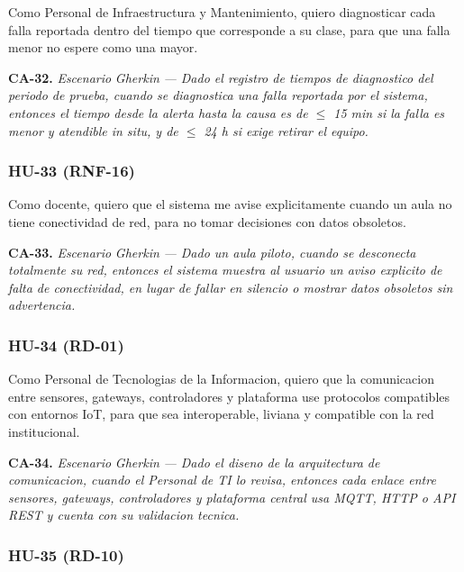 
Como Personal de Infraestructura y Mantenimiento, quiero diagnosticar cada falla reportada dentro del tiempo que corresponde a su clase, para que una falla menor no espere como una mayor.


\textbf{CA-32.} \textit{Escenario }\textit{Gherkin}\textit{ --- Dado el registro de tiempos de diagnostico del periodo de prueba, cuando se diagnostica una falla reportada por el sistema, entonces el tiempo desde la alerta hasta la causa es de $\leq{}$ 15 min si la falla es menor y atendible in situ, y de $\leq{}$ 24 h si exige retirar el equipo.}

\subsubsection*{HU-33 (RNF-16)}


Como docente, quiero que el sistema me avise explicitamente cuando un aula no tiene conectividad de red, para no tomar decisiones con datos obsoletos.


\textbf{CA-33.} \textit{Escenario }\textit{Gherkin}\textit{ --- Dado un aula piloto, cuando se desconecta totalmente su red, entonces el sistema muestra al usuario un aviso explicito de falta de conectividad, en lugar de fallar en silencio o mostrar datos obsoletos sin advertencia.}

\subsubsection*{HU-34 (RD-01)}


Como Personal de Tecnologias de la Informacion, quiero que la comunicacion entre sensores, gateways, controladores y plataforma use protocolos compatibles con entornos IoT, para que sea interoperable, liviana y compatible con la red institucional.


\textbf{CA-34.} \textit{Escenario }\textit{Gherkin}\textit{ --- Dado el diseno de la arquitectura de comunicacion, cuando el Personal de TI lo revisa, entonces cada enlace entre sensores, gateways, controladores y plataforma central usa MQTT, HTTP o API REST y cuenta con su validacion tecnica.}

\subsubsection*{HU-35 (RD-10)}

